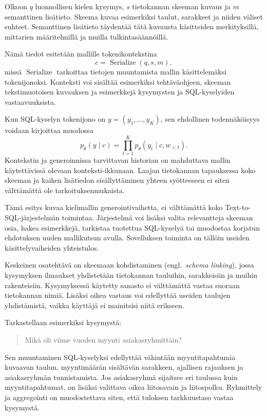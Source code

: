 Olkoon \(q\) luonnollisen kielen kysymys,
\(s\) tietokannan skeeman kuvaus ja \(m\) semanttinen
lisätieto. Skeema kuvaa esimerkiksi taulut, sarakkeet
ja niiden väliset suhteet. Semanttinen lisätieto
täydentää tätä kuvausta käsitteiden merkityksillä,
mittarien määritelmillä ja muilla tulkintasäännöillä.

Nämä tiedot esitetään mallille tokenikontekstina
$$
c=\operatorname{Serialize}(q,s,m),
$$
missä \(\operatorname{Serialize}\) tarkoittaa tietojen
muuntamista mallin käsittelemäksi tokenijonoksi.
Konteksti voi sisältää esimerkiksi tehtäväohjeen,
skeeman tekstimuotoisen kuvauksen ja esimerkkejä
kysymysten ja SQL-kyselyiden vastaavuuksista.

Kun SQL-kyselyn tokenijono on \(y=(y_1,\dots,y_K)\),
sen ehdollinen todennäköisyys voidaan kirjoittaa muodossa
$$
p_{\theta}(y \mid c)
=
\prod_{t=1}^{K}
p_{\theta}(y_t \mid c,w_{<t}).
$$
Kontekstin ja generoinnissa tarvittavan historian on
mahduttava mallin käytettävissä olevaan konteksti-ikkunaan.
Laajan tietokannan tapauksessa koko skeeman ja kaiken
lisätiedon sisällyttäminen yhteen syötteeseen ei siten
välttämättä ole tarkoituksenmukaista.

Tämä esitys kuvaa kielimallin generointivaihetta,
ei välttämättä koko Text-to-SQL-järjestelmän toimintaa.
Järjestelmä voi lisäksi valita relevantteja skeeman osia,
hakea esimerkkejä, tarkistaa tuotettua SQL-kyselyä tai
muodostaa korjatun ehdotuksen uuden mallikutsun avulla.
Sovelluksen toiminta on tällöin useiden käsittelyvaiheiden
yhteistulos.

Keskeinen osatehtävä on skeemaan kohdistaminen
(engl.\ \emph{schema linking}), jossa kysymyksen ilmaukset
yhdistetään tietokannan tauluihin, sarakkeisiin ja muihin
rakenteisiin. Kysymyksessä käytetty sanasto ei välttämättä
vastaa suoraan tietokannan nimiä. Lisäksi oikea vastaus
voi edellyttää useiden taulujen yhdistämistä, vaikka
käyttäjä ei mainitsisi niitä erikseen.

Tarkastellaan esimerkiksi kysymystä:
\begin{quote}
  Mikä oli viime vuoden myynti asiakasryhmittäin?
\end{quote}
Sen muuntaminen SQL-kyselyksi edellyttää vähintään
myyntitapahtumia kuvaavan taulun, myyntimäärän
sisältävän sarakkeen, ajallisen rajauksen ja
asiakasryhmän tunnistamista. Jos asiakasryhmä sijaitsee
eri taulussa kuin myyntitapahtumat, on lisäksi
valittava oikea liitosavain ja liitospolku.
Ryhmittely ja aggregointi on muodostettava siten,
että tuloksen tarkkuustaso vastaa kysymystä.

